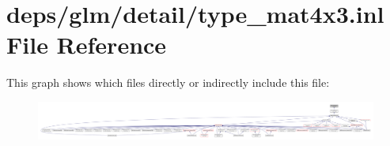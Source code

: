 \hypertarget{type__mat4x3_8inl}{}\section{deps/glm/detail/type\+\_\+mat4x3.inl File Reference}
\label{type__mat4x3_8inl}
This graph shows which files directly or indirectly include this file\+:
\nopagebreak
\begin{figure}[H]
\begin{center}
\leavevmode
\includegraphics[width=350pt]{d3/de1/type__mat4x3_8inl__dep__incl}
\end{center}
\end{figure}
